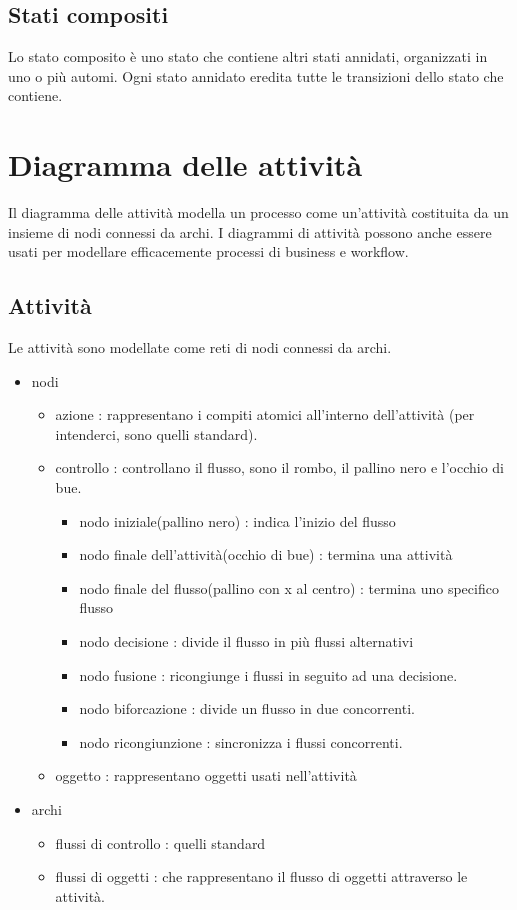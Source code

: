 \documentclass[a4paper,12pt]{report}
\begin{document}
	\subsection{Stati compositi}
	Lo stato composito è uno stato che contiene altri stati annidati, organizzati in uno o più automi. Ogni stato annidato eredita tutte le transizioni dello stato che contiene.
	\section{Diagramma delle attività}
	Il diagramma delle attività modella un processo come un'attività costituita da un insieme di nodi connessi da archi. I diagrammi di attività possono anche essere usati per modellare efficacemente processi di business e workflow.
	\subsection{Attività}
	Le attività sono modellate come reti di nodi connessi da archi. 
	\begin{itemize}
		\item nodi
		\begin{itemize}
			\item azione : rappresentano i compiti atomici all'interno dell'attività (per intenderci, sono quelli standard).
			\item controllo : controllano il flusso, sono il rombo, il pallino nero e l'occhio di bue.
			\begin{itemize}
				\item nodo iniziale(pallino nero) : indica l'inizio del flusso
				\item nodo finale dell'attività(occhio di bue) : termina una attività
				\item nodo finale del flusso(pallino con x al centro) : termina uno specifico flusso
				\item nodo decisione : divide il flusso in più flussi alternativi
				\item nodo fusione : ricongiunge i flussi in seguito ad una decisione.
				\item nodo biforcazione : divide un flusso in due concorrenti.
				\item nodo ricongiunzione : sincronizza i flussi concorrenti.
			\end{itemize}
			\item oggetto : rappresentano oggetti usati nell'attività
		\end{itemize}
		\item archi
		\begin{itemize}
			\item flussi di controllo : quelli standard
			\item flussi di oggetti : che rappresentano il flusso di oggetti attraverso le attività.
		\end{itemize}
	\end{itemize}
\end{document}
